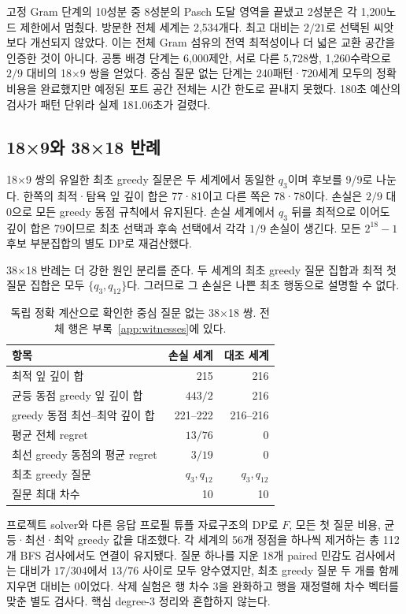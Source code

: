 \documentclass[11pt,a4paper]{article}
\theoremstyle{definition}
\theoremstyle{remark}\newtheorem{remark}[theorem]{주석}
\begin{document}
고정 Gram 단계의 10성분 중 8성분의 Pasch 도달 영역을 끝냈고 2성분은 각 1,200노드 제한에서 멈췄다. 방문한 전체 세계는 2,534개다. 최고 대비는 $2/21$로 선택된 씨앗보다 개선되지 않았다. 이는 전체 Gram 섬유의 전역 최적성이나 더 넓은 교환 공간을 인증한 것이 아니다. 공통 배경 단계는 6,000제안, 서로 다른 5,728쌍, 1,260수락으로 $2/9$ 대비의 18×9 쌍을 얻었다. 중심 질문 없는 단계는 240패턴·720세계 모두의 정확 비용을 완료했지만 예정된 포트 공간 전체는 시간 한도로 끝내지 못했다. 180초 예산의 검사가 패턴 단위라 실제 181.06초가 걸렸다.

\subsection{18×9와 38×18 반례}
18×9 쌍의 유일한 최초 greedy 질문은 두 세계에서 동일한 $q_3$이며 후보를 9/9로 나눈다. 한쪽의 최적·탐욕 잎 깊이 합은 77·81이고 다른 쪽은 78·78이다. 손실은 $2/9$ 대 0으로 모든 greedy 동점 규칙에서 유지된다. 손실 세계에서 $q_3$ 뒤를 최적으로 이어도 깊이 합은 79이므로 최초 선택과 후속 선택에서 각각 $1/9$ 손실이 생긴다. 모든 $2^{18}-1$ 후보 부분집합의 별도 DP로 재검산했다.

38×18 반례는 더 강한 원인 분리를 준다. 두 세계의 최초 greedy 질문 집합과 최적 첫 질문 집합은 모두 $\{q_3,q_{12}\}$다. 그러므로 그 손실은 나쁜 최초 행동으로 설명할 수 없다.
\begin{table}[htbp]\centering\small
\caption{독립 정확 계산으로 확인한 중심 질문 없는 38×18 쌍. 전체 행은 부록~\ref{app:witnesses}에 있다.}\label{tab:finite38}
\begin{tabular}{lrr}\toprule
항목&손실 세계&대조 세계\\\midrule
최적 잎 깊이 합&215&216\\
균등 동점 greedy 잎 깊이 합&$443/2$&216\\
greedy 동점 최선--최악 깊이 합&221--222&216--216\\
평균 전체 regret&$13/76$&0\\
최선 greedy 동점의 평균 regret&$3/19$&0\\
최초 greedy 질문&$q_3,q_{12}$&$q_3,q_{12}$\\
질문 최대 차수&10&10\\\bottomrule
\end{tabular}
\end{table}

프로젝트 solver와 다른 응답 프로필 튜플 자료구조의 DP로 $F$, 모든 첫 질문 비용, 균등·최선·최악 greedy 값을 대조했다. 각 세계의 56개 정점을 하나씩 제거하는 총 112개 BFS 검사에서도 연결이 유지됐다. 질문 하나를 지운 18개 paired 민감도 검사에서는 대비가 $17/304$에서 $13/76$ 사이로 모두 양수였지만, 최초 greedy 질문 두 개를 함께 지우면 대비는 0이었다. 삭제 실험은 행 차수 3을 완화하고 행을 재정렬해 차수 벡터를 맞춘 별도 검사다. 핵심 degree-3 정리와 혼합하지 않는다.
\end{document}
